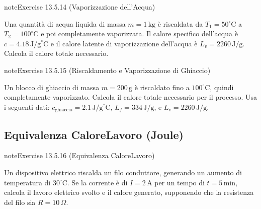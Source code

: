 \documentclass[letterpaper,10pt,italian]{jupyterBook}
\begin{document}
\begin{sphinxadmonition}{note}{Exercise 13.5.14 (Vaporizzazione dell’Acqua)}



\sphinxAtStartPar
Una quantità di acqua liquida di massa \(m = 1 \, \text{kg}\) è riscaldata da \(T_1 = 50^\circ \text{C}\) a \(T_2 = 100^\circ \text{C}\) e poi completamente vaporizzata. Il calore specifico dell’acqua è \(c = 4.18 \, \text{J/g}^\circ \text{C}\) e il calore latente di vaporizzazione dell’acqua è \(L_v = 2260 \, \text{J/g}\). Calcola il calore totale necessario.
\end{sphinxadmonition}
 \label{exercise:ch/thermodynamics/foundation-problems-exercise-14}

\begin{sphinxadmonition}{note}{Exercise 13.5.15 (Riscaldamento e Vaporizzazione di Ghiaccio)}



\sphinxAtStartPar
Un blocco di ghiaccio di massa \(m = 200 \, \text{g}\) è riscaldato fino a \(100^\circ \text{C}\), quindi completamente vaporizzato. Calcola il calore totale necessario per il processo. Usa i seguenti dati: \(c_{\text{ghiaccio}} = 2.1 \, \text{J/g}^\circ \text{C}\), \(L_f = 334 \, \text{J/g}\), e \(L_v = 2260 \, \text{J/g}\).
\end{sphinxadmonition}


\subsection{Equivalenza Calore\sphinxhyphen{}Lavoro (Joule)}
\label{\detokenize{ch/thermodynamics/foundation-problems:equivalenza-calore-lavoro-joule}} \label{exercise:ch/thermodynamics/foundation-problems-exercise-15}

\begin{sphinxadmonition}{note}{Exercise 13.5.16 (Equivalenza Calore\sphinxhyphen{}Lavoro)}



\sphinxAtStartPar
Un dispositivo elettrico riscalda un filo conduttore, generando un aumento di temperatura di \(30^\circ \text{C}\). Se la corrente è di \(I = 2 \, \text{A}\) per un tempo di \(t = 5 \, \text{min}\), calcola il lavoro elettrico svolto e il calore generato, supponendo che la resistenza del filo sia \(R = 10 \, \Omega\).
\end{sphinxadmonition}
 \label{exercise:ch/thermodynamics/foundation-problems-exercise-16}
\end{document}
